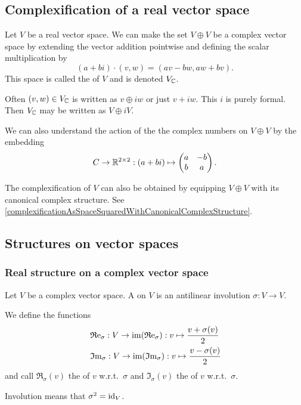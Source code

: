 \subsection{Complexification of a real vector space}
\begin{definition}
Let $V$ be a real vector space. We can make the set $V\oplus V$ be a complex vector space by extending the vector addition pointwise and defining the scalar multiplication by
\[ (a+bi)\cdot(v,w) = (av-bw, aw+bv). \]
This space is called the  of $V$ and is denoted $V_{\mathbb{C}}$.
\end{definition}
Often $(v,w)\in V_{\mathbb{C}}$ is written as $v\oplus iw$ or just $v+iw$. This $i$ is purely formal. Then $V_{\mathbb{C}}$ may be written as $V\oplus iV$.

We can also understand the action of the the complex numbers on $V\oplus V$ by the embedding
\[ C\to \mathbb{R}^{2\times 2}: (a+bi) \mapsto \begin{pmatrix}
a & -b \\
b & a
\end{pmatrix}. \]

The complexification of $V$ can also be obtained by equipping $V\oplus V$ with its canonical complex structure. See \ref{complexificationAsSpaceSquaredWithCanonicalComplexStructure}.

\subsection{Structures on vector spaces}
\subsubsection{Real structure on a complex vector space}
\begin{definition}
Let $V$ be a complex vector space. A  on $V$ is an antilinear involution $\sigma: V\to V$.

We define the functions
\begin{align*}
&\operatorname{\mathfrak{R}e}_\sigma: V\to \operatorname{im}(\operatorname{\mathfrak{R}e}_\sigma): v \mapsto \frac{v+\sigma(v)}{2} \\
&\operatorname{\mathfrak{I}m}_\sigma: V\to \operatorname{im}(\operatorname{\mathfrak{I}m}_\sigma): v \mapsto \frac{v-\sigma(v)}{2}
\end{align*}
and call $\Re_\sigma(v)$ the  of $v$ w.r.t.\ $\sigma$ and $\Im_\sigma(v)$ the  of $v$ w.r.t.\ $\sigma$.
\end{definition}
Involution means that $\sigma^2 = \operatorname{id}_V$.

